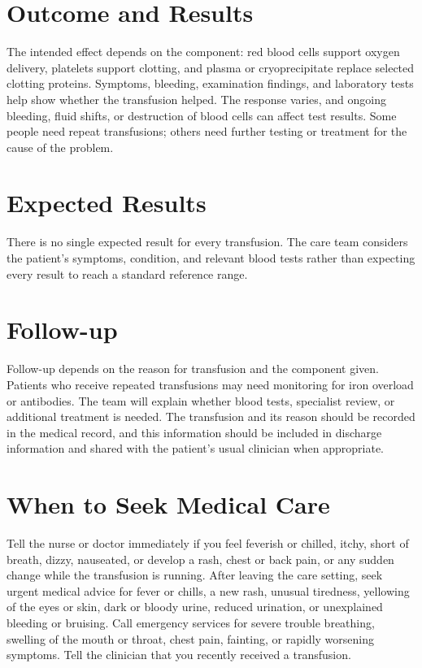 \section*{Outcome and Results}
The intended effect depends on the component: red blood cells support oxygen delivery, platelets support clotting, and plasma or cryoprecipitate replace selected clotting proteins. Symptoms, bleeding, examination findings, and laboratory tests help show whether the transfusion helped. The response varies, and ongoing bleeding, fluid shifts, or destruction of blood cells can affect test results. Some people need repeat transfusions; others need further testing or treatment for the cause of the problem.

\section*{Expected Results}
There is no single expected result for every transfusion. The care team considers the patient's symptoms, condition, and relevant blood tests rather than expecting every result to reach a standard reference range.

\section*{Follow-up}
Follow-up depends on the reason for transfusion and the component given. Patients who receive repeated transfusions may need monitoring for iron overload or antibodies. The team will explain whether blood tests, specialist review, or additional treatment is needed. The transfusion and its reason should be recorded in the medical record, and this information should be included in discharge information and shared with the patient's usual clinician when appropriate.

\section*{When to Seek Medical Care}
Tell the nurse or doctor immediately if you feel feverish or chilled, itchy, short of breath, dizzy, nauseated, or develop a rash, chest or back pain, or any sudden change while the transfusion is running. After leaving the care setting, seek urgent medical advice for fever or chills, a new rash, unusual tiredness, yellowing of the eyes or skin, dark or bloody urine, reduced urination, or unexplained bleeding or bruising. Call emergency services for severe trouble breathing, swelling of the mouth or throat, chest pain, fainting, or rapidly worsening symptoms. Tell the clinician that you recently received a transfusion.

